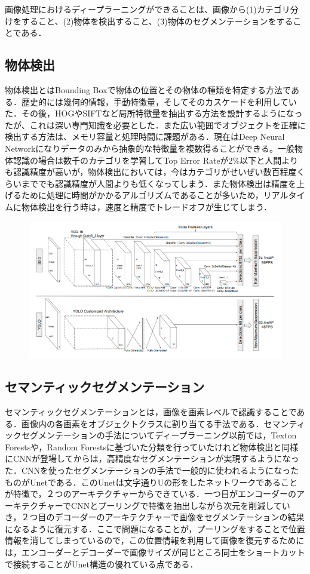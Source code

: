 画像処理におけるディープラーニングができることは、画像から(1)カテゴリ分けをすること、(2)物体を検出すること、(3)物体のセグメンテーションをすることである．

\subsection*{物体検出}
物体検出とはBounding Boxで物体の位置とその物体の種類を特定する方法である．歴史的には幾何的情報，手動特徴量，そしてそのカスケードを利用していた．その後，HOGやSIFTなど局所特徴量を抽出する方法を設計するようになったが、これは深い専門知識を必要とした．また広い範囲でオブジェクトを正確に検出する方法は、メモリ容量と処理時間に課題がある．現在はDeep Neural Networkになりデータのみから抽象的な特徴量を複数得ることができる。一般物体認識の場合は数千のカテゴリを学習してTop Error Rateが2\%以下と人間よりも認識精度が高いが，物体検出においては，今はカテゴリがせいぜい数百程度くらいまででも認識精度が人間よりも低くなってしまう．また物体検出は精度を上げるために処理に時間がかかるアルゴリズムであることが多いため，リアルタイムに物体検出を行う時は，速度と精度でトレードオフが生じてしまう．

\begin{figure}[h]
\centering
\includegraphics[width=0.7\linewidth]{fig/yolo_ssd.png}
\end{figure}

\subsection*{セマンティックセグメンテーション}
セマンティックセグメンテーションとは，画像を画素レベルで認識することである．画像内の各画素をオブジェクトクラスに割り当てる手法である．セマンティックセグメンテーションの手法についてディープラーニング以前では，Texton Forestsや，Random Forestsに基づいた分類を行っていたけれど物体検出と同様にCNNが登場してからは，高精度なセグメンテーションが実現するようになった．CNNを使ったセグメンテーションの手法で一般的に使われるようになったものがUnetである．このUnetは文字通りUの形をしたネットワークであることが特徴で，２つのアーキテクチャーからできている．一つ目がエンコーダーのアーキテクチャーでCNNとプーリングで特徴を抽出しながら次元を削減していき，２つ目のデコーダーのアーキテクチャーで画像をセグメンテーションの結果になるように復元する．ここで問題になることが，プーリングをすることで位置情報を消してしまっているので，この位置情報を利用して画像を復元するためには，エンコーダーとデコーダーで画像サイズが同じところ同士をショートカットで接続することがUnet構造の優れている点である．

